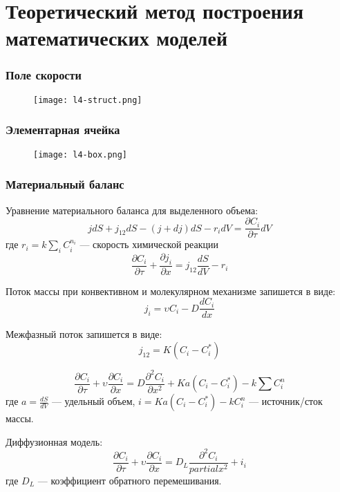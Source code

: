 	\section{Теоретический метод построения математических моделей}
	
\begin{frame}
	\frametitle{Поле скорости}
	
	\begin{figure}[h]
		\texttt{[image: l4-struct.png]}
	\end{figure}
\end{frame}	

\begin{frame}
	\frametitle{Элементарная ячейка}
	
	\begin{figure}[h]
		\texttt{[image: l4-box.png]}
	\end{figure}
\end{frame}	



\begin{frame}
	\frametitle{Материальный баланс}
	Уравнение материального баланса для выделенного объема:
	\begin{equation}
		j dS +j_{12} dS -( j+d j )dS -r_i dV = \dfrac { \partial C_i }  { \partial \tau } dV
	\end{equation}
	где $r_i=k \sum_i C_i^{n_i}$ --- скорость химической реакции
	\begin{equation}
		\dfrac { \partial C_i } { \partial \tau } + \dfrac { \partial j_i } { \partial x } = j_{12} \dfrac { dS } { dV  } - r_i
	\end{equation}
	
	Поток массы при конвективном и молекулярном механизме запишется в виде:
	\begin{equation}
		j_i = \upsilon C_i -D \dfrac{ d C_i } { d x }
	\end{equation}
	
	Межфазный поток запишется в виде:
	\begin{equation}
		j_{12} = K ( C_i - C_i^* )
	\end{equation}
\end{frame}	

\begin{frame}
	\begin{equation}
	\dfrac { \partial C_i } { \partial \tau } + \upsilon \dfrac { \partial C_i }  { \partial x } = D \dfrac { \partial ^2 C_i } {\partial { x^2 }} + K a ( C_i - C_i^* ) - k \sum C_i^n
	\end{equation}
	где $a=\frac{d S}{d V}$ --- удельный объем, $i = K a ( C_i - C_i^* ) -k C_i^n$ --- источник/сток массы.
	
	Диффузионная модель:
	\begin{equation}
	\dfrac { \partial C_i } { \partial \tau } + \upsilon \dfrac { \partial C_i } { \partial x } = D_L \dfrac{ \partial ^2 C_i } {partial { x^2 }}+ i_i
	\end{equation}
	где $D_L$ --- коэффициент обратного перемешивания.
	
	
\end{frame}	

